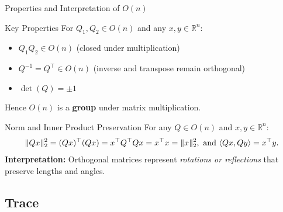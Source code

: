 \documentclass[aspectratio=169]{beamer}
\begin{document}
\begin{frame}{Properties and Interpretation of $O(n)$}

\begin{alertblock}{Key Properties}
For $Q_1,Q_2\in O(n)$ and any $x,y\in\mathbb{R}^n$:
\vspace{-3mm}
\begin{itemize}
  \item $Q_1Q_2\in O(n)$ \hfill (closed under multiplication)
  \vspace{-2mm}
  \item $Q^{-1}=Q^\top\in O(n)$ \hfill (inverse and transpose remain orthogonal)
  \vspace{-2mm}
  \item $\det(Q)=\pm1$
  \vspace{-3mm}
\end{itemize}
Hence $O(n)$ is a \textbf{group} under matrix multiplication.
\end{alertblock}

\pause
\vspace{-3mm}

\begin{exampleblock}{Norm and Inner Product Preservation}
For any $Q\in O(n)$ and $x,y\in\mathbb{R}^n$:
\vspace{-3mm}
\[
\|Qx\|_2^2 = (Qx)^\top (Qx) = x^\top Q^\top Q x = x^\top x = \|x\|_2^2, \,\, \text{and} \,\,
\langle Qx, Qy\rangle = x^\top y.
\vspace{-4mm}
\]
\textbf{Interpretation:} Orthogonal matrices represent \textit{rotations or reflections}
that preserve lengths and angles.
\end{exampleblock}



\end{frame}

\subsection{Trace}
\end{document}
